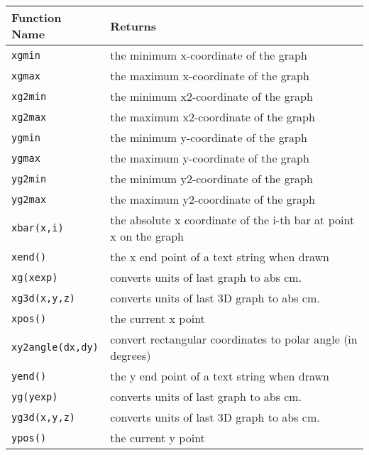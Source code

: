 \begin{supertabular}{ll} \hline
Function Name     & Returns  \\ \hline
{\tt xgmin}  & the minimum x-coordinate of the graph \\
{\tt xgmax}  & the maximum x-coordinate of the graph \\
{\tt xg2min}  & the minimum x2-coordinate of the graph \\
{\tt xg2max}  & the maximum x2-coordinate of the graph \\
{\tt ygmin}  & the minimum y-coordinate of the graph \\
{\tt ygmax}  & the maximum y-coordinate of the graph \\
{\tt yg2min}  & the minimum y2-coordinate of the graph \\
{\tt yg2max}  & the maximum y2-coordinate of the graph \\
{\tt xbar(x,i)}         	& the absolute x coordinate of the i-th bar at point x on the graph \\
{\tt xend()}           	& the x end point of a text string when drawn \\
{\tt xg(xexp)}              & converts units of last graph to abs cm. \\
{\tt xg3d(x,y,z)}         & converts units of last 3D graph to abs cm. \\
{\tt xpos()}           	& the current x point \\
{\tt xy2angle(dx,dy)} & convert rectangular coordinates to polar angle (in degrees)\\
{\tt yend()}           	& the y end point of a text string when drawn \\
{\tt yg(yexp)}              & converts units of last graph to abs cm. \\
{\tt yg3d(x,y,z)}         & converts units of last 3D graph to abs cm. \\
{\tt ypos()}           	& the current y point \\
\end{supertabular}


\newpage


